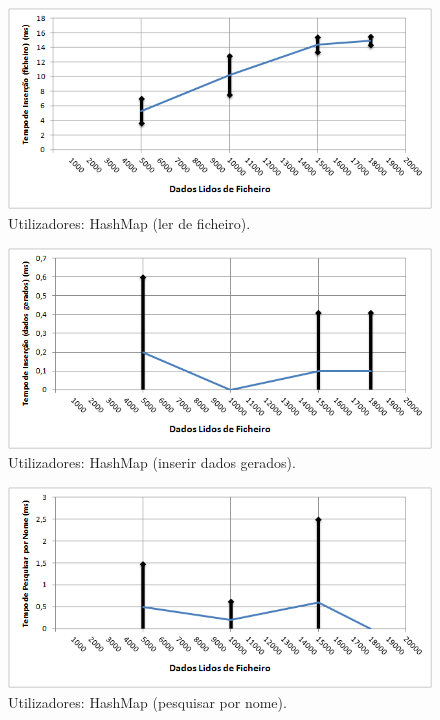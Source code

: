 \documentclass[a5paper,twocolumn, 11pt]{article}
\begin{document}
\begin{figure}[h!b!t!]
    \caption[Utilizadores: HashMap (ler de ficheiro)]{Utilizadores: HashMap (ler de ficheiro).}
    \label{hashtable}
    \centering
        \includegraphics[width=400pt]{user_c3_o1.png}
\end{figure}
\begin{figure}[h!b!t!]
    \caption[Utilizadores: HashMap (inserir dados gerados)]{Utilizadores: HashMap (inserir dados gerados).}
    \label{hashtable}
    \centering
        \includegraphics[width=400pt]{user_c3_o2.png}
\end{figure}
\begin{figure}[h!b!t!]
    \caption[Utilizadores: HashMap (pesquisar por nome)]{Utilizadores: HashMap (pesquisar por nome).}
    \label{hashtable}
    \centering
        \includegraphics[width=400pt]{user_c3_o3.png}
\end{figure}
\end{document}
